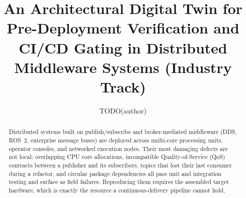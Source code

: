 \documentclass[sigconf,9pt]{acmart}
\begin{document}
\title{An Architectural Digital Twin for Pre-Deployment Verification and CI/CD Gating in Distributed Middleware Systems (Industry Track)}

\author{TODO(author)}

\renewcommand{\shortauthors}{TODO(author)}

\begin{abstract}
Distributed systems built on publish/subscribe and broker-mediated middleware (DDS, ROS~2,
enterprise message buses) are deployed across multi-core processing units, operator consoles, and
networked execution nodes. Their most damaging defects are not local: overlapping CPU core
allocations, incompatible Quality-of-Service (QoS) contracts between a publisher and its
subscribers, topics that lost their last consumer during a refactor, and circular package
dependencies all pass unit and integration testing and surface as field failures. Reproducing them
requires the assembled target hardware, which is exactly the resource a continuous-delivery
pipeline cannot hold.


\end{abstract}
\end{document}
